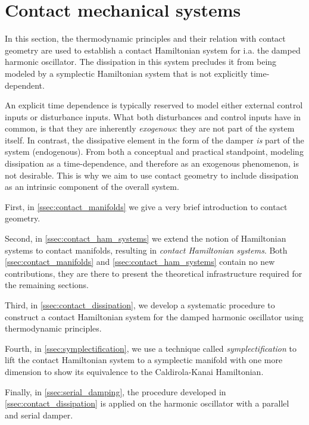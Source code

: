 \section{Contact mechanical systems}
\label{sec:contact}

In this section, the thermodynamic principles and their relation with contact geometry are used to establish a contact Hamiltonian system for i.a. the damped harmonic oscillator. The dissipation in this system precludes it from being modeled by a symplectic Hamiltonian system that is not explicitly time-dependent. 

An explicit time dependence is typically reserved to model either external control inputs or disturbance inputs.%
What both disturbances and control inputs have in common, is that they are inherently \emph{exogenous}: they are not part of the system itself. In contrast, the dissipative element in the form of the damper \emph{is} part of the system (endogenous). From both a conceptual and practical standpoint, modeling dissipation as a time-dependence, and therefore as an exogenous phenomenon, is not desirable. This is why we aim to use contact geometry to include dissipation as an intrinsic component of the overall system.

First, in \cref{ssec:contact_manifolds} we give a very brief introduction to contact geometry. 

Second, in \cref{ssec:contact_ham_systems} we extend the notion of Hamiltonian systems to contact manifolds, resulting in \emph{contact Hamiltonian systems}. Both \cref{ssec:contact_manifolds} and \cref{ssec:contact_ham_systems} contain no new contributions, they are there to present the theoretical infrastructure required for the remaining sections.

Third, in \cref{ssec:contact_dissipation}, we develop a systematic procedure to construct a contact Hamiltonian system for the damped harmonic oscillator using thermodynamic principles.

Fourth, in \cref{ssec:symplectification}, we use a technique called \emph{symplectification} to lift the contact Hamiltonian system to a symplectic manifold with one more dimension to show its equivalence to the Caldirola-Kanai Hamiltonian.

Finally, in \cref{ssec:serial_damping}, the procedure developed in \cref{ssec:contact_dissipation} is applied on the harmonic oscillator with a parallel and serial damper.

